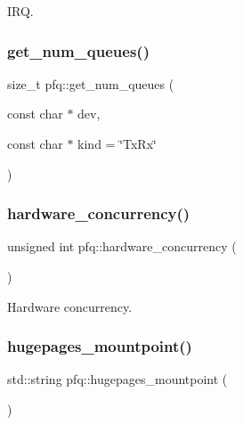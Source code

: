 I\+RQ. 

\mbox{\label{namespacepfq_a35dc28fdd850e9c82f1f3861cce2f9cb}} 
\subsubsection{\texorpdfstring{get\+\_\+num\+\_\+queues()}{get\_num\_queues()}}
{\footnotesize\ttfamily size\+\_\+t pfq\+::get\+\_\+num\+\_\+queues (\begin{DoxyParamCaption}\item[{const char $\ast$}]{dev,  }\item[{const char $\ast$}]{kind = {\ttfamily \char`\"{}TxRx\char`\"{}} }\end{DoxyParamCaption})\hspace{0.3cm}{\ttfamily [inline]}}

\mbox{\label{namespacepfq_a9a9e9be8b77976ed45483448f54de1f9}} 
\subsubsection{\texorpdfstring{hardware\+\_\+concurrency()}{hardware\_concurrency()}}
{\footnotesize\ttfamily unsigned int pfq\+::hardware\+\_\+concurrency (\begin{DoxyParamCaption}{ }\end{DoxyParamCaption})\hspace{0.3cm}{\ttfamily [inline]}}



Hardware concurrency. 

\mbox{\label{namespacepfq_a46be800e747d99af1db9b92a8f296930}} 
\subsubsection{\texorpdfstring{hugepages\+\_\+mountpoint()}{hugepages\_mountpoint()}}
{\footnotesize\ttfamily std\+::string pfq\+::hugepages\+\_\+mountpoint (\begin{DoxyParamCaption}{ }\end{DoxyParamCaption})\hspace{0.3cm}{\ttfamily [inline]}}




